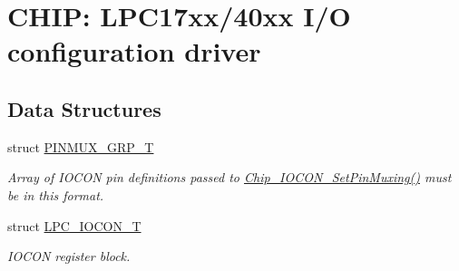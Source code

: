 \hypertarget{group__IOCON__17XX__40XX}{\section{C\-H\-I\-P\-: L\-P\-C17xx/40xx I/\-O configuration driver}
\label{group__IOCON__17XX__40XX}
}
\subsection*{Data Structures}
\begin{DoxyCompactItemize}
\item 
struct \hyperlink{structPINMUX__GRP__T}{P\-I\-N\-M\-U\-X\-\_\-\-G\-R\-P\-\_\-\-T}
\begin{DoxyCompactList}\small\item\em Array of I\-O\-C\-O\-N pin definitions passed to \hyperlink{group__IOCON__17XX__40XX_gad97c96e401016cf296e6d20454f1c522}{Chip\-\_\-\-I\-O\-C\-O\-N\-\_\-\-Set\-Pin\-Muxing()} must be in this format. \end{DoxyCompactList}\item 
struct \hyperlink{structLPC__IOCON__T}{L\-P\-C\-\_\-\-I\-O\-C\-O\-N\-\_\-\-T}
\begin{DoxyCompactList}\small\item\em I\-O\-C\-O\-N register block. \end{DoxyCompactList}\end{DoxyCompactItemize}
